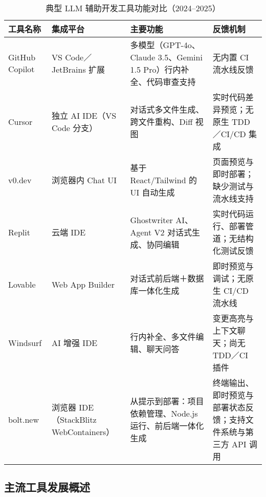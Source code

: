 \begin{table}[htbp]
  \centering
  \footnotesize
  \caption{典型 LLM 辅助开发工具功能对比（2024–2025）}
  \label{tab:llm-tools-updated}
  \setlength{\tabcolsep}{3pt}
  \begin{tabular}{
    >{\raggedright\arraybackslash}p{2.4cm}
    >{\raggedright\arraybackslash}p{2.6cm}
    >{\raggedright\arraybackslash}p{3.6cm}
    >{\raggedright\arraybackslash}p{4.6cm}
  }
    \toprule
    \textbf{工具名称} & \textbf{集成平台} & \textbf{主要功能} & \textbf{反馈机制} \\
    \midrule
    GitHub Copilot\cite{copilotx2023}      & VS Code／JetBrains 扩展        & 多模型（GPT-4o、Claude 3.5、Gemini 1.5 Pro）行内补全、代码审查支持      & 无内置 CI 流水线反馈                                \\
    \addlinespace
    Cursor\cite{cursor2025wiki}            & 独立 AI IDE（VS Code 分支）    & 对话式多文件生成、跨文件重构、Diff 视图              & 实时代码差异预览；无原生 TDD／CI/CD 集成            \\
    \addlinespace
    v0.dev\cite{v0dev2024}                 & 浏览器内 Chat UI               & 基于 React/Tailwind 的 UI 自动生成                  & 页面预览与即时部署；缺少测试与流水线支持            \\
    \addlinespace
    Replit\cite{replit2025wiki}            & 云端 IDE                       & Ghostwriter AI、Agent V2 对话式生成、协同编辑       & 实时代码运行、部署管道；无结构化测试反馈            \\
    \addlinespace
    Lovable\cite{lovable2025times}         & Web App Builder                & 对话式前后端＋数据库一体化生成                      & 即时预览与调试；无原生 CI/CD 流水线                \\
    \addlinespace
    Windsurf\cite{windsurf2024}            & AI 增强 IDE                    & 行内补全、多文件编辑、聊天问答                      & 变更高亮与上下文聊天；尚无 TDD／CI 插件            \\
    \addlinespace
    bolt.new\cite{arunachalam2024boltnew,boltnewgithub2024} & 浏览器 IDE（StackBlitz WebContainers） & 从提示到部署：项目依赖管理、Node.js 运行、前后端一体化生成 & 终端输出、即时预览与部署状态反馈；支持文件系统与第三方 API 调用 \\
    \bottomrule
  \end{tabular}
\end{table}

\subsection{主流工具发展概述}

